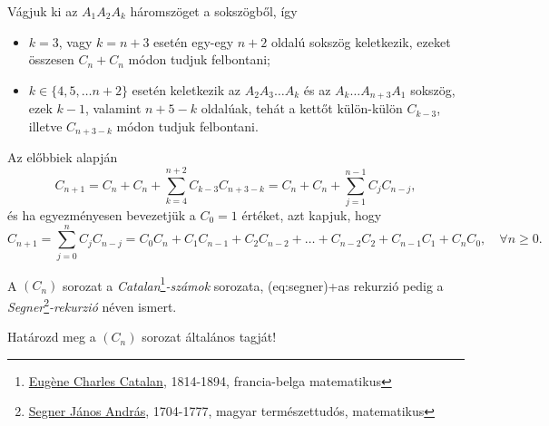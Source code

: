 \begin{solution}
\par Vágjuk ki az $A_{1}A_{2}A_{k}$ háromszöget a sokszögből, így
\begin{itemize} 

\item $k=3$, vagy $k=n+3$ esetén egy-egy $n+2$ oldalú sokszög
keletkezik, ezeket összesen $C_{n}+C_{n}$ módon tudjuk felbontani; 

\item $k\in\{4,5,\dots n+2\}$ esetén keletkezik az $A_{2}A_{3}\dots A_{k}$
és az $A_{k}\dots A_{n+3}A_{1}$ sokszög, ezek $k-1$, valamint $n+5-k$
oldalúak, tehát a kettőt külön-külön $C_{k-3}$, illetve $C_{n+3-k}$
módon tudjuk felbontani. \end{itemize} Az előbbiek alapján 
\[
C_{n+1}=C_{n}+C_{n}+\sum_{k=4}^{n+2}C_{k-3}C_{n+3-k}=C_{n}+C_{n}+\sum_{j=1}^{n-1}C_{j}C_{n-j},
\]
és ha egyezményesen bevezetjük a $C_{0}=1$ értéket, azt kapjuk, hogy
\begin{equation}
C_{n+1}=\sum_{j=0}^{n}C_{j}C_{n-j}=C_{0}C_{n}+C_{1}C_{n-1}+C_{2}C_{n-2}+\ldots+C_{n-2}C_{2}+C_{n-1}C_{1}+C_{n}C_{0},\quad\forall n\ge0.\label{eq:segner}
\end{equation}

A $(C_{n})$ sorozat a \emph{Catalan}\footnote{\href{https://en.wikipedia.org/w/index.php?title=Eug\%C3\%A8ne_Charles_Catalan&oldid=1278416634}{Eugène Charles Catalan}, 1814-1894, francia-belga matematikus}\emph{-számok}
sorozata, \told\aref({eq:segner})+as{} rekurzió pedig a \emph{Segner}\footnote{\href{https://hu.wikipedia.org/w/index.php?title=Segner_J\%C3\%A1nos_Andr\%C3\%A1s&oldid=28084224}{Segner János András}, 1704-1777, magyar természettudós, matematikus}\emph{-rekurzió} néven ismert.
\end{solution}
\begin{problem}
Határozd meg a $(C_{n})$ sorozat általános tagját!
\end{problem}
